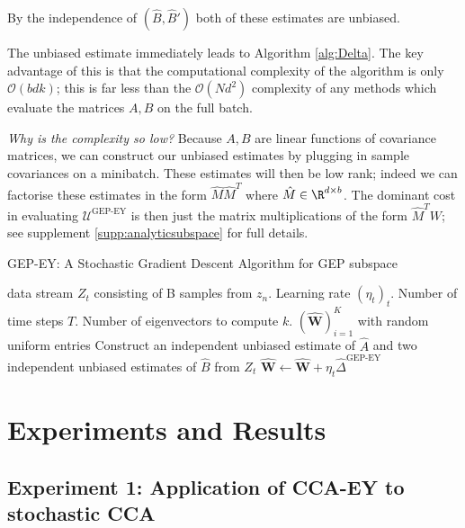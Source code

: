 By the independence of $(\hat{B},\hat{B}')$ both of these estimates are unbiased.

The unbiased estimate immediately leads to Algorithm \ref{alg:Delta}.
The key advantage of this is that the computational complexity of the algorithm is only $\mathcal{O}(b d k)$; this is far less than the $\mathcal{O}(N d^2)$ complexity of any methods which evaluate the matrices $A,B$ on the full batch.

\textit{Why is the complexity so low?} Because $A,B$ are linear functions of covariance matrices, we can construct our unbiased estimates by plugging in sample covariances on a minibatch.
These estimates will then be low rank; indeed we can factorise these estimates in the form $\hat{M} \hat{M}^T$ where $\hat{M} \in \R^{d \times b}$. The dominant cost in evaluating $\mathcal{U}^\text{GEP-EY}$ is then just the matrix multiplications of the form $\hat{M}^T W$; see supplement \ref{supp:analyticsubspace} for full details.

\begin{algorithm}
    \caption{GEP-EY: A Stochastic Gradient Descent Algorithm for GEP subspace}
    \label{alg:Delta}
    \begin{algorithmic}
         data stream $Z_t$ consisting of B samples from $z_n$. Learning rate $(\eta_t)_t$. Number of time steps $T$. Number of eigenvectors to compute $k$.
         $(\hat{\mathbf {W}})_{i=1}^K$ with random uniform entries
        \STATE Construct an independent unbiased estimate of $\hat{A}$ and two independent unbiased estimates of $\hat{B}$ from $Z_t$
        \STATE $\hat{\mathbf {W}} \leftarrow \hat{\mathbf {W}}+\eta_{t} \hat{\Delta}^{\text{GEP-EY}}$
        \ENDFOR
    \end{algorithmic}
\end{algorithm}

\section{Experiments and Results}

\subsection{Experiment 1: Application of CCA-EY to stochastic CCA}


